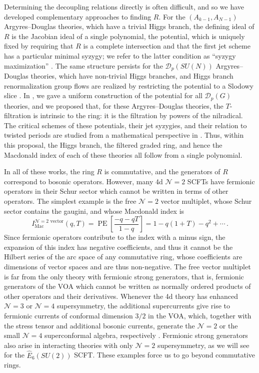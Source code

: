 \documentclass[12pt]{article}
\numberwithin{equation}{section}
\numberwithin{figure}{section}
\theoremstyle{plain}
\theoremstyle{definition}
\begin{document}
Determining the decoupling relations directly is often difficult, and so we have developed complementary approaches to finding $R$. For the $(A_{k-1}, A_{N-1})$ Argyres--Douglas theories, which have a trivial Higgs branch, the defining ideal of $R$ is the Jacobian ideal of a single polynomial, the potential, which is uniquely fixed by requiring that $R$ is a complete intersection and that the first jet scheme has a particular minimal syzygy; we refer to the latter condition as ``syzygy maximization'' \cite{Kang:2026nge}. The same structure persists for the $\mathcal{D}_p(SU(N))$ Argyres--Douglas theories, which have non-trivial Higgs branches, and Higgs branch renormalization group flows are realized by restricting the potential to a Slodowy slice \cite{Kang:2026ona}. In \cite{Kang:2026ney}, we gave a uniform construction of the potential for all $\mathcal{D}_p(G)$ theories, and we proposed that, for these Argyres--Douglas theories, the $T$-filtration is intrinsic to the ring: it is the filtration by powers of the nilradical. The critical schemes of these potentials, their jet syzygies, and their relation to twisted periods are studied from a mathematical perspective in \cite{Kang:2026jnv}. Thus, within this proposal, the Higgs branch, the filtered graded ring, and hence the Macdonald index of each of these theories all follow from a single polynomial.

In all of these works, the ring $R$ is commutative, and the generators of $R$ correspond to bosonic operators. However, many 4d $\mathcal{N}=2$ SCFTs have fermionic operators in their Schur sector which cannot be written in terms of other operators. The simplest example is the free $\mathcal{N}=2$ vector multiplet, whose Schur sector contains the gaugini, and whose Macdonald index is \cite{Gadde:2011uv}
\begin{equation}
    I_\text{Mac}^{\mathcal{N}=2\text{ vector}}(q, T) = \operatorname{PE} \left[ \frac{-q - qT}{1-q} \right] = 1 - q(1 + T) - q^2 + \cdots \,.
\end{equation}
Since fermionic operators contribute to the index with a minus sign, the expansion of this index has negative coefficients, and thus it cannot be the Hilbert series of the arc space of any commutative ring, whose coefficients are dimensions of vector spaces and are thus non-negative. The free vector multiplet is far from the only theory with fermionic strong generators, that is, fermionic generators of the VOA which cannot be written as normally ordered products of other operators and their derivatives. Whenever the 4d theory has enhanced $\mathcal{N}=3$ or $\mathcal{N}=4$ supersymmetry, the additional supercurrents give rise to fermionic currents of conformal dimension $3/2$ in the VOA, which, together with the stress tensor and additional bosonic currents, generate the $\mathcal{N}=2$ or the small $\mathcal{N}=4$ superconformal algebra, respectively \cite{Beem:2013sza,Nishinaka:2016hbw}. Fermionic strong generators also arise in interacting theories with only $\mathcal{N}=2$ supersymmetry, as we will see for the $\widehat{E}_6(SU(2))$ SCFT. These examples force us to go beyond commutative rings.
\end{document}
